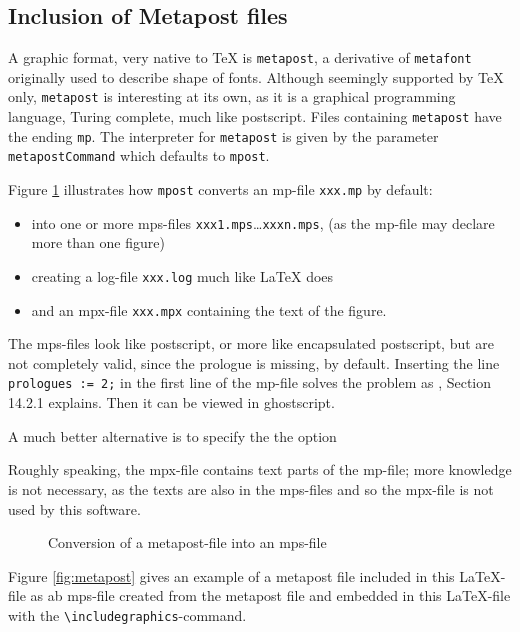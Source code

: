 \documentclass[12pt]{article}
\begin{document}
\subsection{Inclusion of Metapost files}\label{subsec:metapost}

A graphic format, very native to TeX is {\tt metapost}, 
a derivative of {\tt metafont} originally used to describe shape of fonts. 
Although seemingly supported by TeX only, 
{\tt metapost} is interesting at its own, 
as it is a graphical programming language, 
Turing complete, much like postscript. 
Files containing {\tt metapost} have the ending {\tt mp}. 
The interpreter for {\tt metapost} 
is given by the parameter {\tt metapostCommand} 
which defaults to {\tt mpost}. 


Figure \ref{fig:mp2mps} illustrates how {\tt mpost} converts an \gls{mp}-file 
{\tt xxx.mp} by default: 
%
\begin{itemize}
\item
into one or more \gls{mps}-files {\tt xxx1.mps}\dots {\tt xxxn.mps}, 
(as the mp-file may declare more than one figure) 
\item
creating a log-file {\tt xxx.log} much like \LaTeX{} does 
\item
and an \gls{mpx}-file {\tt xxx.mpx} containing the text of the figure. 
\end{itemize}

The mps-files look like postscript, or more like encapsulated postscript, 
but are not completely valid, since the prologue is missing, by default. 
Inserting the line {\tt prologues := 2;} in the first line of the mp-file 
solves the problem as \cite{MPost}, Section 14.2.1 explains. 
Then it can be viewed in ghostscript. 

A much better alternative is to specify the the option 


Roughly speaking, the mpx-file contains text parts of the mp-file; 
more knowledge is not necessary, as the texts are also in the mps-files 
and so the mpx-file is not used by this software. 

\begin{figure}[htb]
\begin{center}

\end{center}
\caption{\label{fig:mp2mps}Conversion of a metapost-file into an mps-file}
\end{figure}


Figure \ref{fig:metapost} gives an example of a metapost file 
included in this \LaTeX-file as ab mps-file 
created from the metapost file 
and embedded in this \LaTeX-file 
with the {\tt\textbackslash includegraphics}-command. 
\end{document}
